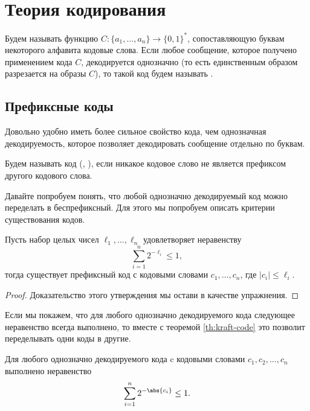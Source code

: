 \section{Теория кодирования}

\begin{definition}
    Будем называть  функцию $C\colon \{a_1, \dots , a_n\} \to \{0, 1\}^{*}$,
    сопоставляющую буквам некоторого алфавита кодовые слова. Если любое сообщение, которое получено
    применением кода $C$, декодируется однозначно (то есть единственным образом разрезается на образы
    $C$), то такой код будем называть .
\end{definition}

\subsection{Префиксные коды}

Довольно удобно иметь более сильное свойство кода, чем однозначная декодируемость, которое позволяет
декодировать сообщение отдельно по буквам.

\begin{definition}
    Будем называть код  (, ), если
    никакое кодовое слово не является префиксом другого кодового слова.
\end{definition}

Давайте попробуем понять, что любой однозначно декодируемый код можно переделать в беспрефиксный. Для
этого мы попробуем описать критерии существования кодов.

\begin{theorem}
    \label{th:kraft-code}
    Пусть набор целых чисел $\ell_1, \dots, \ell_n$ удовлетворяет неравенству
    $$
        \sum\limits_{i = 1}^{n} 2^{-\ell_i} \le 1,
    $$
    тогда существует префиксный код с кодовыми словами $c_1, \dots , c_n$, где $|c_i| \le \ell_i$.
\end{theorem}

\begin{proof}
    Доказательство этого утверждения мы остави в качестве упражнения.
\end{proof} 

Если мы покажем, что для любого однозначно декодируемого кода следующее неравенство всегда выполнено, то
вместе с теоремой \ref{th:kraft-code} это позволит переделывать одни коды в другие.

\begin{proposition}
    Для любого однозначно декодируемого кода c кодовыми словами $c_1, c_2, \dots, c_n$ выполнено
    неравенство
    $$
        \sum_{i = 1}^n 2^{-\abs{c_i}}\le 1.
    $$ 
\end{proposition}

